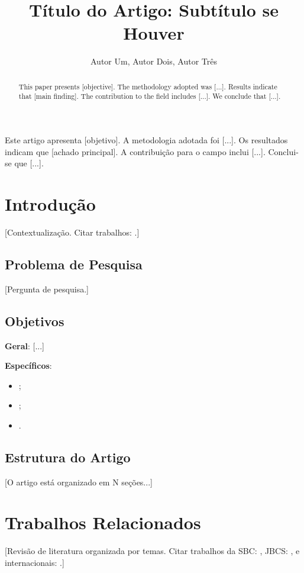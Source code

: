 \documentclass[12pt]{article}
\title{Título do Artigo: Subtítulo se Houver}
\author{Autor Um\inst{1}, Autor Dois\inst{2}, Autor Três\inst{1}}
\begin{document}
\maketitle

\begin{abstract}
This paper presents [objective]. The methodology adopted was [...].
Results indicate that [main finding]. The contribution to the field
includes [...]. We conclude that [...].
\end{abstract}

\begin{resumo}
Este artigo apresenta [objetivo]. A metodologia adotada foi [...].
Os resultados indicam que [achado principal]. A contribuição para
o campo inclui [...]. Conclui-se que [...].
\end{resumo}

\section{Introdução}

[Contextualização. Citar trabalhos: \cite{gil2017}.]

\subsection{Problema de Pesquisa}
[Pergunta de pesquisa.]

\subsection{Objetivos}
\textbf{Geral}: [...]

\textbf{Específicos}:
\begin{itemize}
    \item [obj1];
    \item [obj2];
    \item [obj3].
\end{itemize}

\subsection{Estrutura do Artigo}
[O artigo está organizado em N seções...]

\section{Trabalhos Relacionados}

[Revisão de literatura organizada por temas. Citar trabalhos
da SBC: \cite{exemplo2022}, JBCS: \cite{outro2021}, e
internacionais: \cite{international2020}.]
\end{document}
